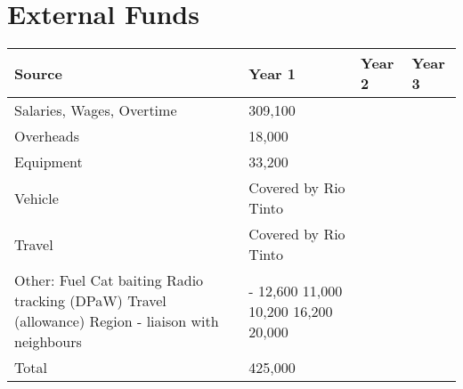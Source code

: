 \documentclass[version=last,
    paper=a4,                               %
    10pt,                                   %
    dvipsnames,
    oneside,                              %
    headings=openany,                       %
    open=any,
    BCOR=7mm,                               %
    DIV=15,     %
]{scrbook}
\begin{document}
\section*{External Funds }



\begin{longtabu} to \linewidth { |  X | X | X | X | }
\hline
{}
Source & Year 1 & Year 2 & Year 3\\
\hline
\endhead



Salaries, Wages, Overtime & 309,100 &  & \\



Overheads & 18,000 &  & \\



Equipment & 33,200 &  & \\



Vehicle & Covered by Rio Tinto &  & \\



Travel & Covered by Rio Tinto &  & \\



Other:
Fuel
Cat baiting
Radio tracking (DPaW)
Travel (allowance)
Region - liaison with neighbours & -
12,600
11,000
10,200
16,200
20,000 &  & \\



Total & 425,000 &  & \\


\hline
\end{longtabu}





\end{document}
